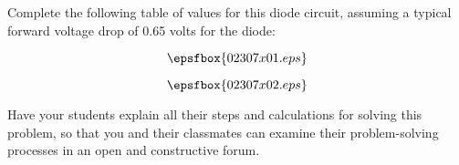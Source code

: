 

Complete the following table of values for this diode circuit, assuming a typical forward voltage drop of 0.65 volts for the diode:

$$\epsfbox{02307x01.eps}$$







$$\epsfbox{02307x02.eps}$$







Have your students explain all their steps and calculations for solving this problem, so that you and their classmates can examine their problem-solving processes in an open and constructive forum.




